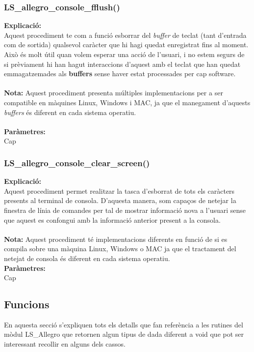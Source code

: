 \documentclass[11pt]{article}
\begin{document}
\newpage
\subsubsection{LS\_allegro\_console\_fflush()}
\textbf{Explicació:}\\
Aquest procediment te com a funció esborrar del \textit{buffer} de teclat (tant d'entrada com de sortida) qualsevol caràcter que hi hagi quedat enregistrat fins al moment. Això és molt útil quan volem esperar una acció de l'usuari, i no estem segurs de si prèviament hi han hagut interaccions d'aquest amb el teclat que han quedat emmagatzemades als \textbf{buffers} sense haver estat processades per cap software.\\\\
\textbf{Nota:} Aquest procediment presenta múltiples implementacions per a ser compatible en màquines Linux, Windows i MAC, ja que el manegament d'aquests \textit{buffers} és diferent en cada sistema operatiu.\\\\
\textbf{Paràmetres:}\\ Cap

\subsubsection{LS\_allegro\_console\_clear\_screen()}
\textbf{Explicació:}\\
Aquest procediment permet realitzar la tasca d'esborrat de tots els caràcters presents al terminal de consola. D'aquesta manera, som capaços de netejar la finestra de línia de comandes per tal de mostrar informació nova a l'usuari sense que aquest es confongui amb la informació anterior present a la consola.\\\\
\textbf{Nota:} Aquest procediment té implementacions diferents en funció de si es compila sobre una màquina Linux, Windows o MAC ja que el tractament del netejat de consola és diferent en cada sistema operatiu.\\

\noindent \textbf{Paràmetres:}\\ Cap

\pagebreak
\subsection{Funcions}
En aquesta secció s'expliquen tots els detalls que fan referència a les rutines del mòdul LS\_Allegro que retornen algun tipus de dada diferent a void que pot ser interessant recollir en alguns dels cassos.
\end{document}
